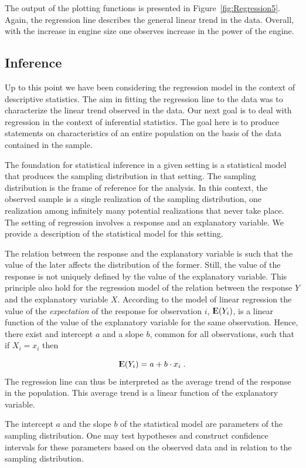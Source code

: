 \documentclass[]{krantz}
\newcommand{\Expec}{{\rm I\kern-.3em E}}
\theoremstyle{definition}
\theoremstyle{definition}
\theoremstyle{definition}
\theoremstyle{remark}
\begin{document}
The output of the plotting functions is presented in
Figure~\ref{fig:Regression5}. Again, the regression line describes the
general linear trend in the data. Overall, with the increase in engine
size one observes increase in the power of the engine.

\subsection{Inference}\label{subsec:Inference}

Up to this point we have been considering the regression model in the
context of descriptive statistics. The aim in fitting the regression
line to the data was to characterize the linear trend observed in the
data. Our next goal is to deal with regression in the context of
inferential statistics. The goal here is to produce statements on
characteristics of an entire population on the basis of the data
contained in the sample.

The foundation for statistical inference in a given setting is a
statistical model that produces the sampling distribution in that
setting. The sampling distribution is the frame of reference for the
analysis. In this context, the observed sample is a single realization
of the sampling distribution, one realization among infinitely many
potential realizations that never take place. The setting of regression
involves a response and an explanatory variable. We provide a
description of the statistical model for this setting.

The relation between the response and the explanatory variable is such
that the value of the later affects the distribution of the former.
Still, the value of the response is not uniquely defined by the value of
the explanatory variable. This principle also hold for the regression
model of the relation between the response \(Y\) and the explanatory
variable \(X\). According to the model of linear regression the value of
the \emph{expectation} of the response for observation \(i\),
\(\Expec(Y_i)\), is a linear function of the value of the explanatory
variable for the same observation. Hence, there exist and intercept
\(a\) and a slope \(b\), common for all observations, such that if
\(X_i = x_i\) then

\[\Expec(Y_i) = a + b \cdot x_i\;.\] The regression line can thus be
interpreted as the average trend of the response in the population. This
average trend is a linear function of the explanatory variable.

The intercept \(a\) and the slope \(b\) of the statistical model are
parameters of the sampling distribution. One may test hypotheses and
construct confidence intervals for these parameters based on the
observed data and in relation to the sampling distribution.
\end{document}
